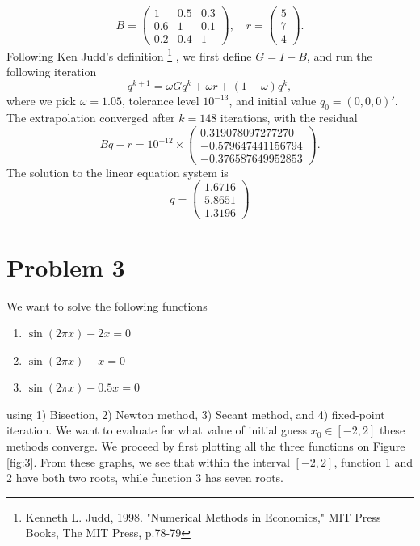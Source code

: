 \documentclass[11pt]{article}
\newcommand{\1}{\mathbbm{1}}
\newcounter{daggerfootnote}
\newcommand*{\daggerfootnote}[1]{%
	\setcounter{daggerfootnote}{\value{footnote}}%
	\renewcommand*{\thefootnote}{\fnsymbol{footnote}}%
	\footnote[2]{#1}%
	\setcounter{footnote}{\value{daggerfootnote}}%
	\renewcommand*{\thefootnote}{\arabic{footnote}}%
}
\begin{document}
\[B = \begin{pmatrix}
 1&0.5&0.3\\0.6&1&0.1\\0.2&0.4&1
\end{pmatrix}, \quad r = \begin{pmatrix}
	5\\7\\4
\end{pmatrix}. \]
Following Ken Judd's definition\daggerfootnote{Kenneth L. Judd, 1998. "Numerical Methods in Economics," MIT Press Books, The MIT Press, p.78-79}, we first define $G=I-B$, and run the following iteration
\[q^{k+1}=\omega G q^k +\omega r + (1-\omega)q^k,\] 
where we pick $\omega=1.05$, tolerance level $10^{-13}$, and initial value $q_0=(0,0,0)'$. The extrapolation converged after $k=148$ iterations, with the residual 
\[Bq-r =  10^{-12} \times
\begin{pmatrix}
0.319078097277270\\
-0.579647441156794\\
-0.376587649952853
\end{pmatrix}.\] 
The solution to the linear equation system is
\[
q=\begin{pmatrix}
	1.6716\\
	5.8651\\
	1.3196
\end{pmatrix}
\]
\section*{Problem 3}
We want to solve the following functions 
\begin{enumerate}
	\item $\sin(2\pi x)-2x=0$
	\item $\sin(2\pi x)-x=0$
	\item $\sin(2\pi x)-0.5x=0$
\end{enumerate}
using 1) Bisection, 2) Newton method, 3) Secant method, and 4) fixed-point iteration. We want to evaluate for what value of initial guess $x_0\in[-2,2]$ these methods converge. We proceed by first plotting all the three functions on Figure \ref{fig:3}. From these graphs, we see that within the interval $[-2,2]$, function 1 and 2 have both two roots, while function 3 has seven roots.
\end{document}
